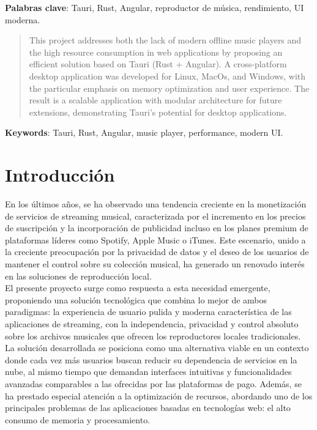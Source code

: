 \documentclass[11pt, a4paper]{article}
\begin{document}
\noindent \textbf{Palabras clave}: Tauri, Rust, Angular, reproductor de música, rendimiento, UI moderna.

\begin{abstract}
    This project addresses both the lack of modern offline music players and the high resource consumption in web applications by proposing an efficient solution based on Tauri (Rust + Angular). A cross-platform desktop application was developed for Linux, MacOs, and Windows, with the particular emphasis on memory optimization and user experience. The result is a scalable application with modular architecture for future extensions, demonstrating Tauri's potential for desktop applications.
\end{abstract}

\noindent \textbf{Keywords}: Tauri, Rust, Angular, music player, performance, modern UI.


\clearpage

\tableofcontents
\listoffigures
\listoftables
\lstlistoflistings


\clearpage


\setcounter{page}{1}
\section{Introducción}

En los últimos años, se ha observado una tendencia creciente en la monetización de servicios de streaming musical, caracterizada por el incremento en los precios de suscripción y la incorporación de publicidad incluso en los planes premium de plataformas líderes como Spotify, Apple Music o iTunes. Este escenario, unido a la creciente preocupación por la privacidad de datos y el deseo de los usuarios de mantener el control sobre su colección musical, ha generado un renovado interés en las soluciones de reproducción local. \\

El presente proyecto surge como respuesta a esta necesidad emergente, proponiendo una solución tecnológica que combina lo mejor de ambos paradigmas: la experiencia de usuario pulida y moderna característica de las aplicaciones de streaming, con la independencia, privacidad y control absoluto sobre los archivos musicales que ofrecen los reproductores locales tradicionales. \\

La solución desarrollada se posiciona como una alternativa viable en un contexto donde cada vez más usuarios buscan reducir su dependencia de servicios en la nube, al mismo tiempo que demandan interfaces intuitivas y funcionalidades avanzadas comparables a las ofrecidas por las plataformas de pago. Además, se ha prestado especial atención a la optimización de recursos, abordando uno de los principales problemas de las aplicaciones basadas en tecnologías web: el alto consumo de memoria y procesamiento. \\
\end{document}
